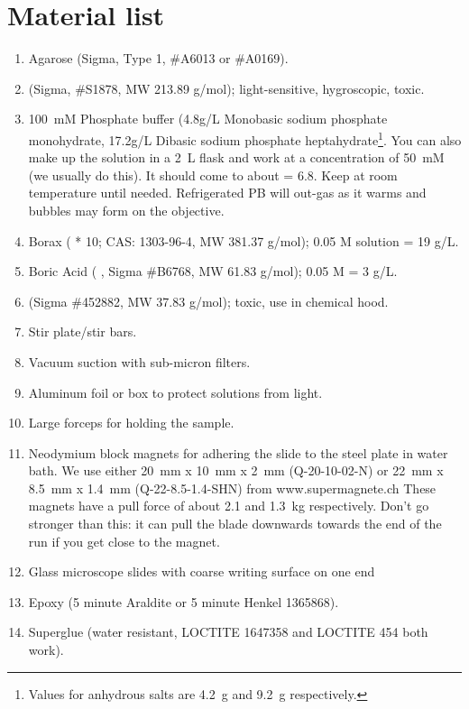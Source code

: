\documentclass[paper=a4, fontsize=11pt]{scrartcl} %
\numberwithin{equation}{section} %
\numberwithin{figure}{section} %
\numberwithin{table}{section} %
\begin{document}
\section{Material list}
\begin{enumerate}
\item Agarose (Sigma, Type 1, \#A6013 or \#A0169).
\item {} (Sigma, \#S1878, MW 213.89 g/mol); light-sensitive, hygroscopic, toxic.
\item 100~mM Phosphate buffer (4.8g/L Monobasic sodium phosphate monohydrate, 17.2g/L Dibasic sodium phosphate heptahydrate\footnote{Values for anhydrous salts are 4.2~g and 9.2~g respectively.}. You can also make up the solution in a 2~L flask and work at a concentration of 50~mM (we usually do this). 
It should come to about \pH = 6.8.
Keep at room temperature until needed. 
Refrigerated PB will out-gas as it warms and bubbles may form on the objective. 
\item Borax ( * 10; CAS: 1303-96-4, MW 381.37 g/mol); 0.05 M solution = 19 g/L.
\item Boric Acid ( , Sigma \#B6768, MW 61.83 g/mol); 0.05 M = 3 g/L.
\item {} (Sigma \#452882, MW 37.83 g/mol); toxic, use in chemical hood.
\item Stir plate/stir bars.
\item Vacuum suction with sub-micron filters.
\item Aluminum foil or box to protect solutions from light. 
\item Large forceps for holding the sample. 
\item Neodymium block magnets for adhering the slide to the steel plate in water bath. 
      We use either 20~mm x 10~mm x 2~mm (Q-20-10-02-N) or 22~mm x 8.5~mm x 1.4~mm (Q-22-8.5-1.4-SHN) from www.supermagnete.ch
      These magnets have a pull force of about 2.1 and 1.3~kg respectively.
      Don't go stronger than this: it can pull the blade downwards towards the end of the run if you get close to the magnet.
\item Glass microscope slides with coarse writing surface on one end
\item Epoxy (5 minute Araldite or 5 minute Henkel 1365868).
\item Superglue (water resistant, LOCTITE 1647358 and LOCTITE 454 both work).
\end{enumerate}
\end{document}

